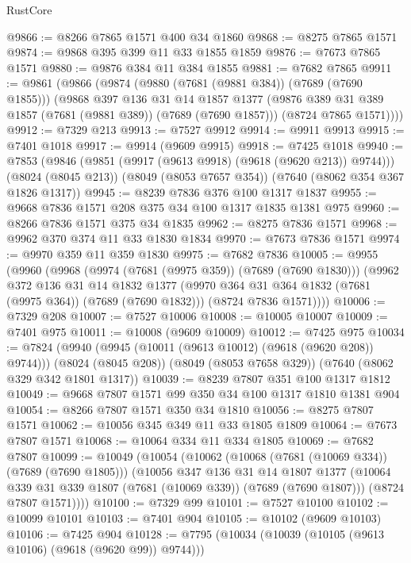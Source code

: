 \begin{lexlean}{RustCore}
\begin{coremodule}
@9866 := @8266 @7865 @1571 @400 @34 @1860
@9868 := @8275 @7865 @1571
@9874 := @9868 @395 @399 @11 @33 @1855 @1859
@9876 := @7673 @7865 @1571
@9880 := @9876 @384 @11 @384 @1855
@9881 := @7682 @7865
@9911 := @9861
    (@9866
      (@9874
        (@9880 (@7681 (@9881 @384)) (@7689 (@7690 @1855)))
        (@9868
          @397
          @136
          @31
          @14
          @1857
          @1377
          (@9876 @389 @31 @389 @1857 (@7681 (@9881 @389)) (@7689 (@7690 @1857)))
          (@8724 @7865 @1571))))
@9912 := @7329 @213
@9913 := @7527 @9912
@9914 := @9911 @9913
@9915 := @7401 @1018
@9917 := @9914 (@9609 @9915)
@9918 := @7425 @1018
@9940 := @7853
    (@9846 (@9851 (@9917 (@9613 @9918) (@9618 (@9620 @213)) @9744)))
    (@8024 (@8045 @213))
    (@8049 (@8053 @7657 @354))
    (@7640 (@8062 @354 @367 @1826 @1317))
@9945 := @8239 @7836 @376 @100 @1317 @1837
@9955 := @9668 @7836 @1571 @208 @375 @34 @100 @1317 @1835 @1381 @975
@9960 := @8266 @7836 @1571 @375 @34 @1835
@9962 := @8275 @7836 @1571
@9968 := @9962 @370 @374 @11 @33 @1830 @1834
@9970 := @7673 @7836 @1571
@9974 := @9970 @359 @11 @359 @1830
@9975 := @7682 @7836
@10005 := @9955
    (@9960
      (@9968
        (@9974 (@7681 (@9975 @359)) (@7689 (@7690 @1830)))
        (@9962
          @372
          @136
          @31
          @14
          @1832
          @1377
          (@9970 @364 @31 @364 @1832 (@7681 (@9975 @364)) (@7689 (@7690 @1832)))
          (@8724 @7836 @1571))))
@10006 := @7329 @208
@10007 := @7527 @10006
@10008 := @10005 @10007
@10009 := @7401 @975
@10011 := @10008 (@9609 @10009)
@10012 := @7425 @975
@10034 := @7824
    (@9940 (@9945 (@10011 (@9613 @10012) (@9618 (@9620 @208)) @9744)))
    (@8024 (@8045 @208))
    (@8049 (@8053 @7658 @329))
    (@7640 (@8062 @329 @342 @1801 @1317))
@10039 := @8239 @7807 @351 @100 @1317 @1812
@10049 := @9668 @7807 @1571 @99 @350 @34 @100 @1317 @1810 @1381 @904
@10054 := @8266 @7807 @1571 @350 @34 @1810
@10056 := @8275 @7807 @1571
@10062 := @10056 @345 @349 @11 @33 @1805 @1809
@10064 := @7673 @7807 @1571
@10068 := @10064 @334 @11 @334 @1805
@10069 := @7682 @7807
@10099 := @10049
    (@10054
      (@10062
        (@10068 (@7681 (@10069 @334)) (@7689 (@7690 @1805)))
        (@10056
          @347
          @136
          @31
          @14
          @1807
          @1377
          (@10064 @339 @31 @339 @1807 (@7681 (@10069 @339)) (@7689 (@7690 @1807)))
          (@8724 @7807 @1571))))
@10100 := @7329 @99
@10101 := @7527 @10100
@10102 := @10099 @10101
@10103 := @7401 @904
@10105 := @10102 (@9609 @10103)
@10106 := @7425 @904
@10128 := @7795
    (@10034 (@10039 (@10105 (@9613 @10106) (@9618 (@9620 @99)) @9744)))

\end{coremodule}
\end{lexlean}
